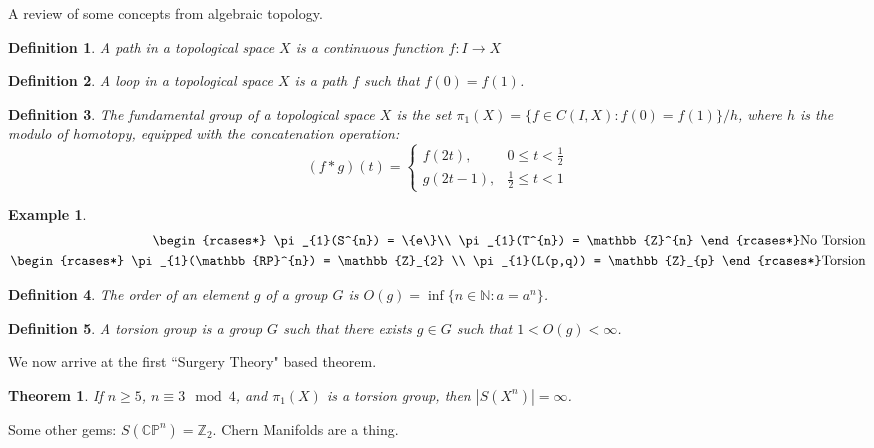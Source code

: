 \documentclass[oneside]{book}
\theoremstyle{mystyle}
\newtheorem{theorem}{Theorem}[section]
\newtheorem{definition}{Definition}[section]
\newtheorem{example}{Example}[section]
\begin{document}
A review of some concepts from algebraic topology.
\begin{definition}
A path in a topological space $X$ is a continuous function $f:I\rightarrow X$
\end{definition}
\begin{definition}
A loop in a topological space $X$ is a path $f$ such that $f(0)=f(1)$.
\end{definition}
\begin{definition}
The fundamental group of a topological space $X$ is the set $\pi_{1}(X) = \{f\in C(I,X):f(0) = f(1)\}/h$, where $h$ is the modulo of homotopy, equipped with the concatenation operation:
\begin{equation*}
    (f*g)(t) = \begin{cases} f(2t), & 0\leq t < \frac{1}{2}\\ g(2t-1), & \frac{1}{2}\leq t < 1\end{cases}
\end{equation*}
\end{definition}
\begin{example}
\begin{align*}
    \begin{rcases*} \pi_{1}(S^{n}) = \{e\}\\ \pi_{1}(T^{n}) = \mathbb{Z}^{n} \end{rcases*} \textrm{No Torsion}\\
    \begin{rcases*} \pi_{1}(\mathbb{RP}^{n}) = \mathbb{Z}_{2} \\ \pi_{1}(L(p,q)) = \mathbb{Z}_{p} \end{rcases*} \textrm{Torsion}
\end{align*}
\end{example}
\begin{definition}
The order of an element $g$ of a group $G$ is $O(g) = \inf\{n\in \mathbb{N}:a = a^{n}\}$.
\end{definition}
\begin{definition}
A torsion group is a group $G$ such that there exists $g\in G$ such that $1<O(g)<\infty$.
\end{definition}
We now arrive at the first ``Surgery Theory" based theorem.
\begin{theorem}
If $n\geq 5$, $n\equiv 3\! \mod 4$, and $\pi_{1}(X)$ is a torsion group, then $|S(X^{n})| = \infty$.
\end{theorem}
Some other gems: $S(\mathbb{C}\mathbb{P}^{n}) = \mathbb{Z}_{2}$. Chern Manifolds are a thing.
\end{document}
